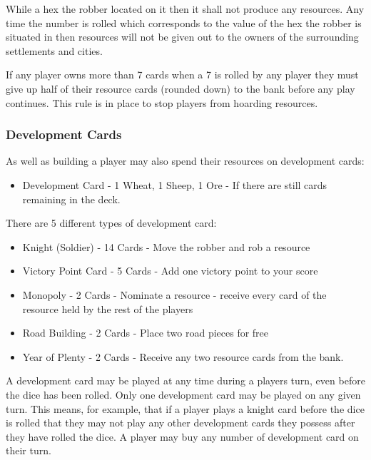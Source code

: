 \documentclass[]{article}
\begin{document}
\par While a hex the robber located on it then it shall not produce any resources. Any time the number is rolled which corresponds to the value of the hex the robber is situated in then resources will not be given out to the owners of the surrounding settlements and cities.

\par If any player owns more than 7 cards when a 7 is rolled by any player they must give up half of their resource cards (rounded down) to the bank before any play continues. This rule is in place to stop players from hoarding resources. 

\subsubsection{Development Cards}
As well as building a player may also spend their resources on development cards:
\begin{itemize}
	\item Development Card - 1 Wheat, 1 Sheep, 1 Ore - If there are still cards remaining in the deck.
\end{itemize}

\par There are 5 different types of development card:

\begin{itemize}
	\item Knight (Soldier) - 14 Cards - Move the robber and rob a resource
	\item Victory Point Card - 5 Cards - Add one victory point to your score
	\item Monopoly - 2 Cards - Nominate a resource - receive every card of the resource held by the rest of the players
	\item Road Building - 2 Cards - Place two road pieces for free
	\item Year of Plenty - 2 Cards - Receive any two resource cards from the bank.
\end{itemize}

\par A development card may be played at any time during a players turn, even before the dice has been rolled. Only one development card may be played on any given turn. This means, for example, that if a player plays a knight card before the dice is rolled that they may not play any other development cards they possess after they have rolled the dice. A player may buy any number of development card on their turn.
\end{document}
